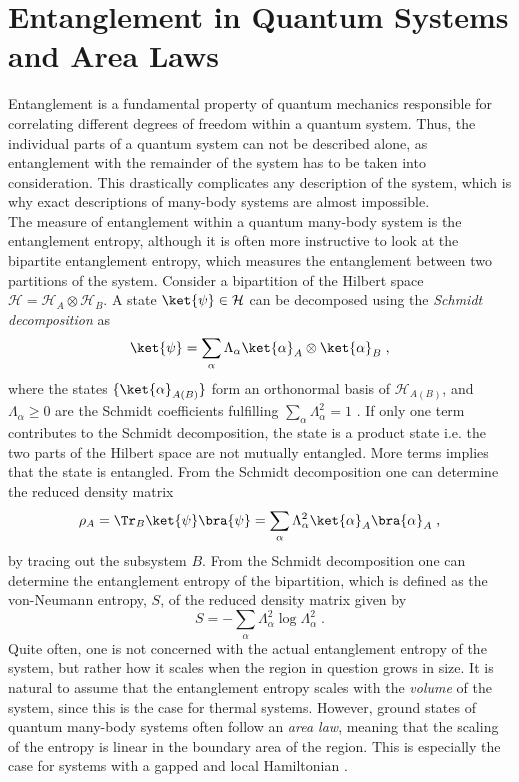 \section{Entanglement in Quantum Systems and Area Laws}
Entanglement is a fundamental property of quantum mechanics responsible for correlating different degrees of freedom within a quantum system. Thus, the individual parts of a quantum system can not be described alone, as entanglement with the remainder of the system has to be taken into consideration. This drastically complicates any description of the system, which is why exact descriptions of many-body systems are almost impossible.\\
The measure of entanglement within a quantum many-body system is the entanglement entropy, although it is often more instructive to look at the bipartite entanglement entropy, which measures the entanglement between two partitions of the system.
Consider a bipartition of the Hilbert space $\mathcal{H} = \mathcal{H}_A \otimes \mathcal{H}_B$. A state $\ket{\psi} \in \mathcal{H}$ can be decomposed using the \textit{Schmidt decomposition} as
\begin{equation}
	\ket{\psi} = \sum_{\alpha} \Lambda_{\alpha} \ket{\alpha}_A \otimes \ket{\alpha}_B \; ,
\end{equation}
where the states $\{ \ket{\alpha}_{A(B)} \}$ form an orthonormal basis of $\mathcal{H}_{A(B)}$, and $\Lambda_{\alpha} \ge 0$ are the Schmidt coefficients fulfilling $\sum_{\alpha} \Lambda_{\alpha}^2 = 1$ \cite{Pathak2013}. If only one term contributes to the Schmidt decomposition, the state is a product state i.e. the two parts of the Hilbert space are not mutually entangled. More terms implies that the state is entangled. From the Schmidt decomposition one can determine the reduced density matrix
\begin{equation}
	\rho_A = \Tr _B \ket{\psi}\bra{\psi} = \sum_{\alpha} \Lambda_{\alpha}^2 \ket{\alpha}_A \bra{\alpha}_A \; ,  
\end{equation}
by tracing out the subsystem $B$. 
From the Schmidt decomposition one can determine the entanglement entropy of the bipartition, which is defined as the von-Neumann entropy, $S$, of the reduced density matrix given by \cite{Pathak2013}
\begin{equation}
	S = - \sum_{\alpha} \Lambda_{\alpha}^2 \log \Lambda_{\alpha}^2 \; .
\end{equation}
Quite often, one is not concerned with the actual entanglement entropy of the system, but rather how it scales when the region in question grows in size. It is natural to assume that the entanglement entropy scales with  the \textit{volume} of the system, since this is the case for thermal systems. However, ground states of quantum many-body systems often follow an \textit{area law}, meaning that the scaling of the entropy is linear in the boundary area of the region. This is especially the case for systems with a gapped and local Hamiltonian \cite{Cramer}.\\
